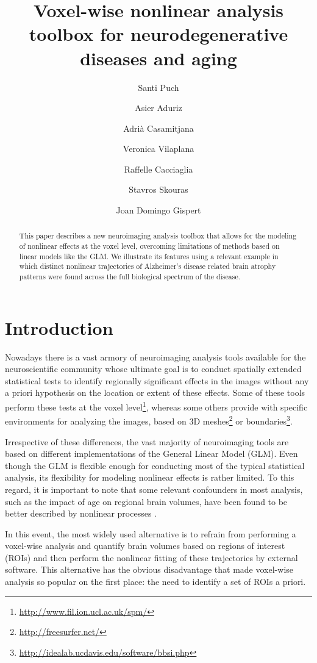 \documentclass{article}
\title{Voxel-wise nonlinear analysis toolbox for neurodegenerative diseases and aging}
\author[1]{Santi Puch}
\author[1]{Asier Aduriz}
\author[1]{Adrià Casamitjana}
\author[1]{Veronica Vilaplana}
\author[2]{Raffelle Cacciaglia}
\author[2]{Stavros Skouras}
\author[2]{Joan Domingo Gispert}
\affil[1]{Universitat Politècnica de Catalunya, Barcelona, Spain \\
\texttt{ \{santiago.puch, asier.aduriz\}@alu-etsetb.upc.edu, \{adria.casamitjana, veronica.vilaplana\}@upc.edu }}
\affil[2]{Barcelona$\beta$eta Brain Research Center, Barcelona, Spain \\
\texttt{\{rcacciaglia, sskouras, jdgispert\}@fpmaragall.org}}
\begin{document}

\maketitle

\begin{abstract}
This paper describes a new neuroimaging analysis toolbox that allows for the modeling of nonlinear effects at the voxel level, overcoming limitations of methods based on linear models like the GLM. We illustrate its features using a relevant example in which distinct nonlinear trajectories of Alzheimer's disease related brain atrophy patterns were found across the full biological spectrum of the disease.
\end{abstract}

\section{Introduction}

Nowadays there is a vast armory of neuroimaging analysis tools available for the neuroscientific community whose ultimate goal is to conduct spatially extended statistical tests to identify regionally significant effects in the images without any a priori hypothesis on the location or extent of these effects. Some of these tools perform these tests at the voxel level\footnote{\url{http://www.fil.ion.ucl.ac.uk/spm/}}, whereas some others provide with specific environments for analyzing the images, based on 3D meshes\footnote{\url{http://freesurfer.net/}} or boundaries\footnote{\url{http://idealab.ucdavis.edu/software/bbsi.php}}. 

Irrespective of these differences, the vast majority of neuroimaging tools are based on different implementations of the General Linear Model (GLM). Even though the GLM is flexible enough for conducting most of the typical statistical analysis, its flexibility for modeling nonlinear effects is rather limited. To this regard, it is important to note that some relevant confounders in most analysis, such as the impact of age on regional brain volumes, have been found to be better described by nonlinear processes \cite{nonlinear_subcortical,nonlinear_cortical}.

In this event, the most widely used alternative is to refrain from performing a voxel-wise analysis and quantify brain volumes based on regions of interest (ROIs) and then perform the nonlinear fitting of these trajectories by external software. This alternative has the obvious disadvantage that made voxel-wise analysis so popular on the first place: the need to identify a set of ROIs a priori. 
\end{document}
